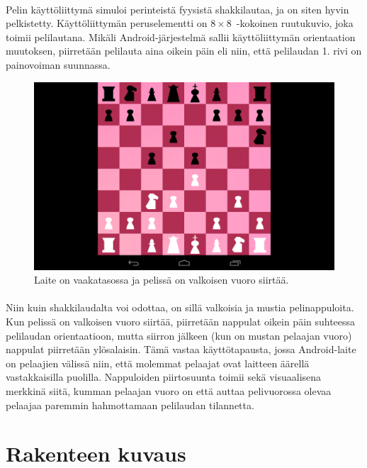 \documentclass[11pt]{article}
\begin{document}
\paragraph{} Pelin käyttöliittymä simuloi perinteistä fyysistä shakkilautaa, ja on siten hyvin pelkistetty. Käyttöliittymän peruselementti on $8\times8$~-kokoinen ruutukuvio, joka toimii pelilautana. Mikäli Android-järjestelmä sallii käyt\-tö\-liit\-ty\-män orientaation muutoksen, piirretään pelilauta aina oikein päin eli niin, että pelilaudan 1. rivi on painovoiman suunnassa.

\begin{figure}
\includegraphics[width=\linewidth]{vaakakali.png}
\caption{Laite on vaakatasossa ja pelissä on valkoisen vuoro siirtää.}
\end{figure}

\paragraph{} Niin kuin shakkilaudalta voi odottaa, on sillä valkoisia ja mustia pelinappuloita. Kun pelissä on valkoisen vuoro siirtää, piirretään nappulat oikein päin suhteessa pelilaudan orientaatioon, mutta siirron jälkeen (kun on mustan pelaajan vuoro) nappulat piirretään ylösalaisin. Tämä vastaa käyttötapausta, jossa Android-laite on pelaajien välissä niin, että molemmat pelaajat ovat laitteen äärellä vastakkaisilla puolilla. Nappuloiden piirtosuunta toimii sekä visuaalisena merkkinä siitä, kumman pelaajan vuoro on että auttaa pelivuorossa olevaa pelaajaa paremmin hahmottamaan pelilaudan tilannetta.

\section{Rakenteen kuvaus}
\end{document}
